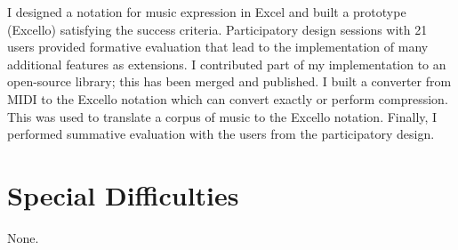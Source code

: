 I designed a notation for music expression in Excel and built a prototype (Excello) satisfying the success criteria. Participatory design sessions with 21 users provided formative evaluation that lead to the implementation of many additional features as extensions. I contributed part of my implementation to an open-source library; this has been merged and published. I built a converter from MIDI to the Excello notation which can convert exactly or perform compression. This was used to translate a corpus of music to the Excello notation. Finally, I performed summative evaluation with the users from the participatory design.

\section*{Special Difficulties}

None.

\tableofcontents

